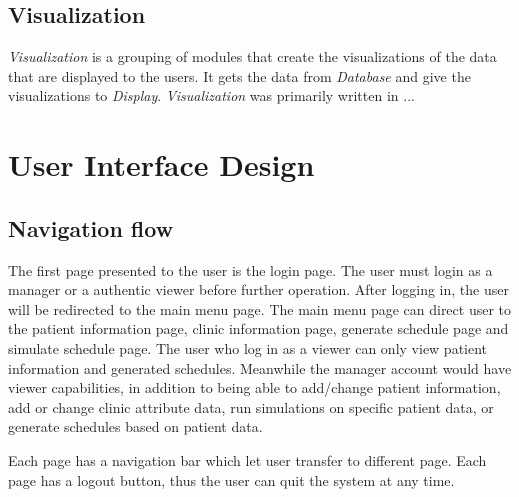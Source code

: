 \documentclass[12pt]{article}
\begin{document}
\subsection{Visualization}
\textit{Visualization} is a grouping of modules that create
the visualizations of the data that are displayed to the users. 
It gets the data from \textit{Database} and give the visualizations to \textit{Display}. \textit{Visualization} was primarily written in ...

\section{User Interface Design}

\subsection{Navigation flow}
The first page presented to the user is the login page. The user must login as a manager or a authentic viewer before further operation. After logging in, the user will be redirected to the main menu page. The main menu page can direct user to the patient information page, clinic information page, generate schedule page and simulate schedule page. The user who log in as a viewer can only view patient information and generated schedules. Meanwhile the manager account would have viewer capabilities, in addition to being able to add/change patient information, add or change clinic attribute data, run simulations on specific patient data, or generate schedules based on patient data.

\noindent \newline
Each page has a navigation bar which let user transfer to different page. Each page has a logout button, thus the user can quit the system at any time. 

\begin{figure}[!h]
\centering
\end{figure}
\end{document}
